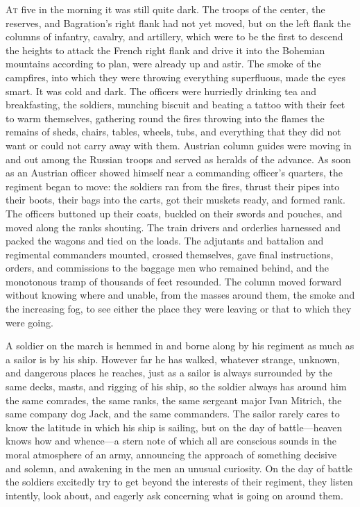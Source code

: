 \lettrine[lines=2, loversize=0.3, lraise=0]{\initfamily A}{t}
five in the morning it was still quite dark. The troops of the
center, the reserves, and Bagration's right flank had not yet
moved, but on the left flank the columns of infantry, cavalry,
and artillery, which were to be the first to descend the heights
to attack the French right flank and drive it into the Bohemian
mountains according to plan, were already up and astir. The smoke
of the campfires, into which they were throwing everything
superfluous, made the eyes smart. It was cold and dark. The
officers were hurriedly drinking tea and breakfasting, the
soldiers, munching biscuit and beating a tattoo with their feet
to warm themselves, gathering round the fires throwing into the
flames the remains of sheds, chairs, tables, wheels, tubs, and
everything that they did not want or could not carry away with
them. Austrian column guides were moving in and out among the
Russian troops and served as heralds of the advance. As soon as
an Austrian officer showed himself near a commanding officer's
quarters, the regiment began to move: the soldiers ran from the
fires, thrust their pipes into their boots, their bags into the
carts, got their muskets ready, and formed rank. The officers
buttoned up their coats, buckled on their swords and pouches, and
moved along the ranks shouting. The train drivers and orderlies
harnessed and packed the wagons and tied on the loads. The
adjutants and battalion and regimental commanders mounted,
crossed themselves, gave final instructions, orders, and
commissions to the baggage men who remained behind, and the
monotonous tramp of thousands of feet resounded. The column moved
forward without knowing where and unable, from the masses around
them, the smoke and the increasing fog, to see either the place
they were leaving or that to which they were going.

A soldier on the march is hemmed in and borne along by his
regiment as much as a sailor is by his ship. However far he has
walked, whatever strange, unknown, and dangerous places he
reaches, just as a sailor is always surrounded by the same decks,
masts, and rigging of his ship, so the soldier always has around
him the same comrades, the same ranks, the same sergeant major
Ivan Mitrich, the same company dog Jack, and the same
commanders. The sailor rarely cares to know the latitude in which
his ship is sailing, but on the day of battle---heaven knows how
and whence---a stern note of which all are conscious sounds in
the moral atmosphere of an army, announcing the approach of
something decisive and solemn, and awakening in the men an
unusual curiosity. On the day of battle the soldiers excitedly
try to get beyond the interests of their regiment, they listen
intently, look about, and eagerly ask concerning what is going on
around them.

